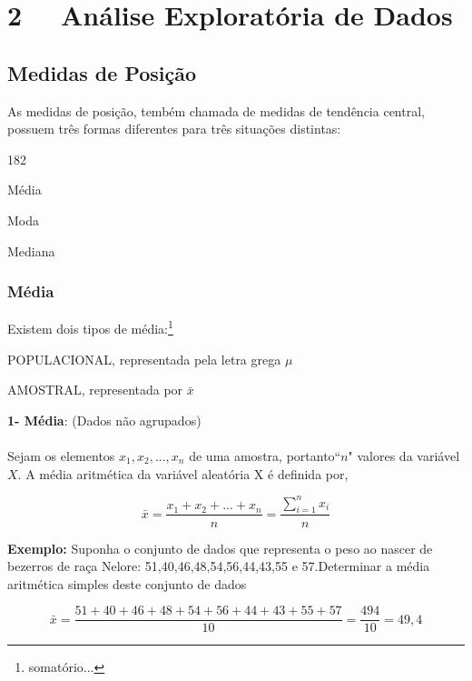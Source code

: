 \documentclass{book}
\begin{document}
\tableofcontents	
\newpage

\backmatter
\setcounter{chapter}{2}
\chapter{2 \ \ Análise Exploratória de Dados}

\section{Medidas de Posição}

As medidas de posição, tembém chamada de medidas de tendência central, possuem três formas diferentes para três situações distintas:

\begin{dingautolist}{182}

    \item Média
    \item  Moda
    \item  Mediana
    
\end{dingautolist}

\subsection{Média}
Existem dois tipos de média:\footnote{somatório...}

\begin{dinglist}{43}
\item POPULACIONAL, representada pela letra grega $\mu$
\item AMOSTRAL, representada por $\bar{x}$

\end{dinglist}

\textbf{1- Média}: (Dados não agrupados) \\
\\
Sejam os elementos $x_1, x_2,...,x_n$ de uma amostra, portanto``$n$" valores da variável $X$. A média aritmética da variável aleatória X é definida por, 

$$\bar{x} = \frac{x_1 + x_2 + ... + x_n}{n} = \frac{\sum_{i=1}^n{x_i}}{n}$$

\textbf{Exemplo:} Suponha o conjunto de dados que representa o peso ao nascer de bezerros de raça Nelore: 51,40,46,48,54,56,44,43,55 e 57.Determinar a média aritmética simples deste conjunto de dados

$$\bar{x}= \frac{51+40+46+48+54+56+44+43+55+57}{10} = \frac{494}{10} = 49,4$$
\end{document}
